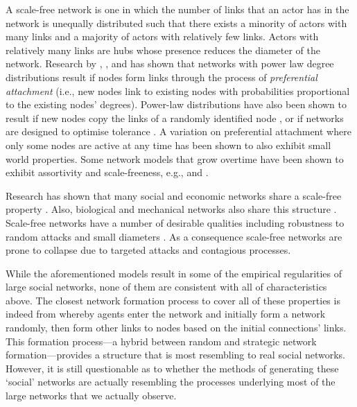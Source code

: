 A scale-free network is one in which the number of links that an actor has in the network is unequally distributed such that there exists a minority of actors with many links and a majority of actors with relatively few links. Actors with relatively many links are hubs whose presence reduces the diameter of the network. Research by \citet{Price1976}, \citet{BarabasiAlbert1999}, and \citet{CooperFrieze2003} has shown that networks with power law degree distributions result if nodes form links through the process of \emph{preferential attachment} (i.e., new nodes link to existing nodes with probabilities proportional to the existing nodes' degrees). Power-law distributions have also been shown to result if new nodes copy the links of a randomly identified node \citep{Kleinberg1999, Kumar2000}, or if networks are designed to optimise tolerance \citep{Fabrikant2003}. A variation on preferential attachment where only some nodes are active at any time \citep{Klemm2002a} has been shown to also exhibit small world properties. Some network models that grow overtime have been shown to exhibit assortivity and scale-freeness, e.g., \citet{Callaway2001} and \citet{Krapivsky2002}.

Research has shown that many social and economic networks share a scale-free property \citep{Faloutsos1999, DorogovtsevMendes2003, Barabasi2009, Barabasi2012}. Also, biological and mechanical networks also share this structure \citep{Barabasi2011}. Scale-free networks have a number of desirable qualities including robustness to random attacks and small diameters \citep{AlbertJeongBarabasi1999, AlbertJeongBarabasi2000}. As a consequence scale-free networks are prone to collapse due to targeted attacks and contagious processes.

While the aforementioned models result in some of the empirical regularities of large social networks, none of them are consistent with all of characteristics above. The closest network formation process to cover all of these properties is indeed from \citet{JacksonRogers2007} whereby agents enter the network and initially form a network randomly, then form other links to nodes based on the initial connections' links. This formation process---a hybrid between random and strategic network formation---provides a structure that is most resembling to real social networks. However, it is still questionable as to whether the methods of generating these `social' networks are actually resembling the processes underlying most of the large networks that we actually observe.

